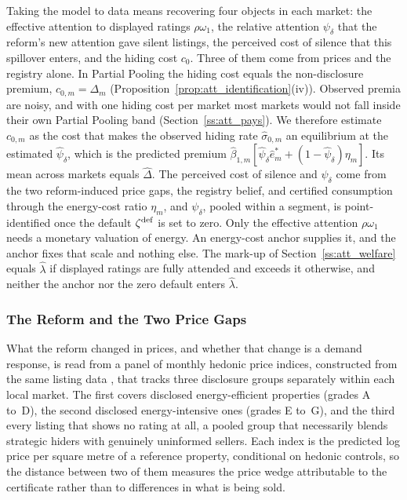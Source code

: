 Taking the model to data means recovering four objects in each market: the effective attention to displayed ratings $\rho\omega_1$, the relative attention $\psi_\delta$ that the reform's new attention gave silent listings, the perceived cost of silence that this spillover enters, and the hiding cost $c_0$. Three of them come from prices and the registry alone. In Partial Pooling the hiding cost equals the non-disclosure premium, $c_{0,m}=\Delta_m$ (Proposition~\ref{prop:att_identification}(iv)). Observed premia are noisy, and with one hiding cost per market most markets would not fall inside their own Partial Pooling band (Section~\ref{ss:att_pays}). We therefore estimate $c_{0,m}$ as the cost that makes the observed hiding rate $\hat\sigma_{0,m}$ an equilibrium at the estimated $\hat\psi_\delta$, which is the predicted premium $\hat\beta_{1,m}[\hat\psi_\delta\hat e^*_m+(1-\hat\psi_\delta)\eta_m]$. Its mean across markets equals $\hat\Delta$. The perceived cost of silence and $\psi_\delta$ come from the two reform-induced price gaps, the registry belief, and certified consumption through the energy-cost ratio $\eta_m$, and $\psi_\delta$, pooled within a segment, is point-identified once the default $\zeta^{\rm def}$ is set to zero. Only the effective attention $\rho\omega_1$ needs a monetary valuation of energy. An energy-cost anchor supplies it, and the anchor fixes that scale and nothing else. The mark-up of Section~\ref{ss:att_welfare} equals $\hat\lambda$ if displayed ratings are fully attended and exceeds it otherwise, and neither the anchor nor the zero default enters $\hat\lambda$.

\subsubsection{The Reform and the Two Price Gaps}

What the reform changed in prices, and whether that change is a demand response, is read from a panel of monthly hedonic price indices, constructed from the same listing data \citep{patras_mandatory_2024}, that tracks three disclosure groups separately within each local market. The first covers disclosed energy-efficient properties (grades A to~D), the second disclosed energy-intensive ones (grades E to~G), and the third every listing that shows no rating at all, a pooled group that necessarily blends strategic hiders with genuinely uninformed sellers. Each index is the predicted log price per square metre of a reference property, conditional on hedonic controls, so the distance between two of them measures the price wedge attributable to the certificate rather than to differences in what is being sold.

